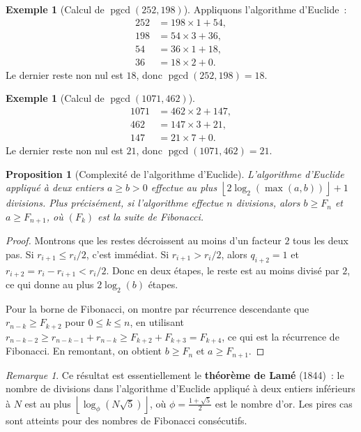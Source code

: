 \documentclass[12pt,a4paper,openany]{book}
\theoremstyle{definition}
\newtheorem{exemple}[definition]{Exemple}
\theoremstyle{plain}
\newtheorem{proposition}[definition]{Proposition}
\theoremstyle{remark}
\newtheorem{remarque}[definition]{Remarque}
\newcommand{\floor}[1]{\left\lfloor #1 \right\rfloor}
\DeclareMathOperator{\pgcd}{pgcd}
\begin{document}
\begin{exemple}[Calcul de $\pgcd(252, 198)$]
\label{ex:euclide:252_198}
Appliquons l'algorithme d'Euclide~:
\begin{align*}
  252 &= 198 \times 1 + 54, \\
  198 &= 54 \times 3 + 36, \\
  54  &= 36 \times 1 + 18, \\
  36  &= 18 \times 2 + 0.
\end{align*}
Le dernier reste non nul est $18$, donc $\pgcd(252, 198) = 18$.
\end{exemple}

\begin{exemple}[Calcul de $\pgcd(1071, 462)$]
\label{ex:euclide:1071_462}
\begin{align*}
  1071 &= 462 \times 2 + 147, \\
  462  &= 147 \times 3 + 21, \\
  147  &= 21 \times 7 + 0.
\end{align*}
Le dernier reste non nul est $21$, donc $\pgcd(1071, 462) = 21$.
\end{exemple}

\begin{proposition}[Complexité de l'algorithme d'Euclide]
\label{prop:euclide:complexite}
L'algorithme d'Euclide appliqué à deux entiers $a \geq b > 0$ effectue au plus
$\floor{2\log_2(\max(a,b))} + 1$ divisions. Plus précisément, si l'algorithme
effectue $n$ divisions, alors $b \geq F_{n}$ et $a \geq F_{n+1}$, où $(F_k)$ est
la suite de Fibonacci.
\end{proposition}

\begin{proof}
Montrons que les restes décroissent au moins d'un facteur $2$ tous les deux pas.
Si $r_{i+1} \leq r_i / 2$, c'est immédiat. Si $r_{i+1} > r_i / 2$, alors
$q_{i+2} = 1$ et $r_{i+2} = r_i - r_{i+1} < r_i / 2$. Donc en deux étapes, le
reste est au moins divisé par $2$, ce qui donne au plus $2\log_2(b)$ étapes.

Pour la borne de Fibonacci, on montre par récurrence descendante que
$r_{n-k} \geq F_{k+2}$ pour $0 \leq k \leq n$, en utilisant $r_{n-k-2} \geq
r_{n-k-1} + r_{n-k} \geq F_{k+2} + F_{k+3} = F_{k+4}$, ce qui est la récurrence
de Fibonacci. En remontant, on obtient $b \geq F_{n}$ et $a \geq F_{n+1}$.
\end{proof}

\begin{remarque}
\label{rem:euclide:lamé}
Ce résultat est essentiellement le \textbf{théorème de Lamé}
(1844)~: le nombre de divisions dans l'algorithme d'Euclide appliqué à deux entiers
inférieurs à $N$ est au plus $\floor{\log_\phi(N\sqrt{5})}$, où $\phi =
\frac{1+\sqrt{5}}{2}$ est le nombre d'or. Les pires cas sont atteints pour des
nombres de Fibonacci consécutifs.
\end{remarque}
\end{document}
